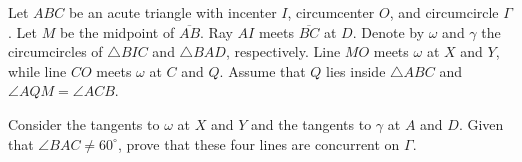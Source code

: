 Let $ABC$ be an acute triangle with incenter $I$, circumcenter $O$, and circumcircle $\Gamma$. Let $M$ be the midpoint of $\overline{AB}$. Ray $AI$ meets $\overline{BC}$ at $D$. Denote by $\omega$ and $\gamma$ the circumcircles of $\triangle{BIC}$ and $\triangle{BAD}$, respectively. Line $MO$ meets $\omega$ at $X$ and $Y$, while line $CO$ meets $\omega$ at $C$ and $Q$. Assume that $Q$ lies inside $\triangle{ABC}$ and $\angle{AQM}=\angle{ACB}$.

Consider the tangents to $\omega$ at $X$ and $Y$ and the tangents to $\gamma$ at $A$ and $D$. Given that $\angle{BAC}\neq60^\circ$, prove that these four lines are concurrent on $\Gamma$.
